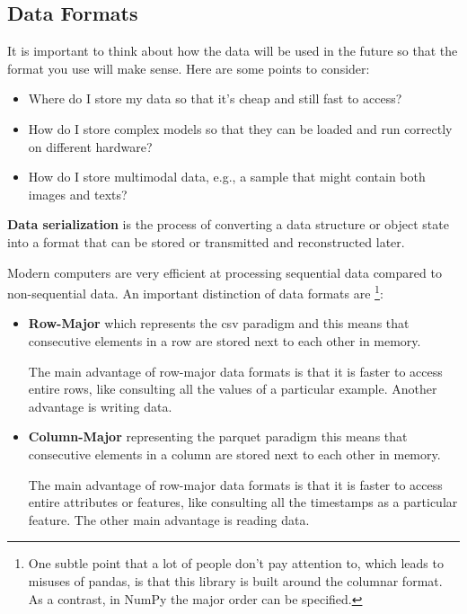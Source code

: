 \subsection{Data Formats}
It is important to think about how the data will be used in the 
future so that the format you use will make sense. Here are some 
points to consider:
\begin{itemize}
    \item Where do I store my data so that it's cheap and still
    fast to access?

    \item How do I store complex models so that they can be loaded
    and run correctly on different hardware?

    \item How do I store multimodal data, e.g., a sample that might
    contain both images and texts?
\end{itemize}

\textbf{Data serialization} is the process of converting a data
structure or object state into a format that can be stored or
transmitted and reconstructed later.

Modern computers are very efficient at processing sequential data
compared to non-sequential data. An important distinction of data
formats are
\footnote{
    One subtle point that a lot of people don't pay attention to,
    which leads to misuses of pandas, is that this library is
    built around the columnar format. As a contrast, in NumPy
    the major order can be specified.
}:
\begin{itemize}
    \item \textbf{Row-Major} which represents the csv paradigm
    and this means that consecutive elements in a row are stored
    next to each other in memory.

    The main advantage of row-major data formats is that it is
    faster to access entire rows, like consulting all the values
    of a particular example. Another advantage is writing data.

    \item \textbf{Column-Major} representing the parquet paradigm
    this means that consecutive elements in a column are stored
    next to each other in memory.
    
    The main advantage of row-major data formats is that it is
    faster to access entire attributes or features, like
    consulting all the timestamps as a particular feature.
    The other main advantage is reading data.
\end{itemize}


